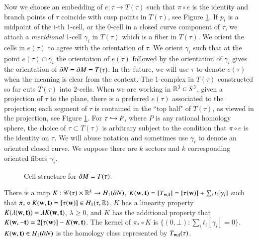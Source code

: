 \documentclass[12pt]{article}
\theoremstyle{remark}
\begin{document}
Now we choose an embedding of $e:\tau\to T(\tau)$ such that $\pi\circ e$ is the identity and branch points of $\tau $ coincide with cusp points in $T(\tau)$, see Figure \ref{Cell}.  If $p_i$ is a midpoint of the i-th 1-cell, or the 0-cell in a closed curve component of $\tau$, we attach a {\it meridional} 1-cell  $\gamma_i$ in $T(\tau)$ which is a fiber in $T(\tau)$.   We orient the cells in $e(\tau)$ to agree with the orientation of $\tau$.  We orient $\gamma_i$ such that at the point $e(\tau)\cap \gamma_i$ the orientation of $e(\tau)$ followed by the orientation of $\gamma_i$ gives the orientation of $\partial N=\partial M= T(\tau)$.  In the future, we will use $\tau$ to denote $e(\tau)$ when the meaning is clear from the context.
The 1-complex in $T(\tau)$ constructed so far cuts $T(\tau)$ into 2-cells.  When we are working in $\mathbb R^3\subset S^3$, given a projection of $\tau$ to the plane, there is a preferred $e(\tau)$ associated to the projection; each segment of $\tau$ is contained in the ``top half" of $T(\tau)$, as viewed in the projection, see Figure \ref{Cell}.   For $\tau\hookrightarrow P$, where $P$ is any rational homology sphere, the choice of $\tau\subset T(\tau)$ is arbitrary subject to the condition that $\pi\circ e$ is the identity on $\tau$.   We will abuse notation and sometimes use $\gamma_i$ to denote an oriented closed curve. We suppose there are $k$ sectors and $k$ corresponding oriented fibers $\gamma_i$.

\begin{figure}[H]
\centering
{}
\caption{\footnotesize Cell structure for $\partial M=T(\tau)$. }
\label{Cell}
\end{figure}



 

 
 \begin{lemma} \label{K}
 There is a map $K:\mathscr{C}(\tau)\times \mathbb R^k\to H_1(\partial N)$, $K({\bf w},{\bf t})=[T_{{\bf w},{\bf t}}]=[\tau({\bf w})]+\sum_i t_i[\gamma_i]$ such that $\pi_*\circ K({\bf w},{\bf t})=[\tau({\bf w})]\in H_1(\tau,\mathbb R)$.  $K$ has a linearity property $K(\lambda({\bf w},{\bf t}))=\lambda K({\bf w},{\bf t})$, $\lambda\ge 0$, and $K$ has the additional property that $K({\bf w},-{\bf t})=2[\tau({\bf w})]-K({\bf w},{\bf t})$.   The kernel of $\pi_*\circ K$ is $\{(0,\bot):\sum_i t_i[\gamma_i]=0\}$.   $K({\bf w},{\bf t})\in H_1(\partial N)$ is the homology class represented by $T_{{\bf w},{\bf t}}(\tau)$.
 \end{lemma} 
 
\end{document}
